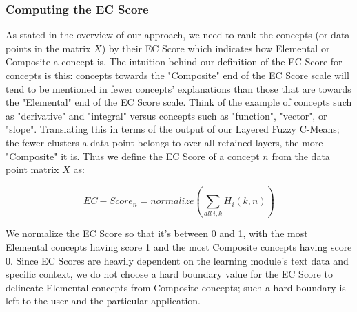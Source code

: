 \subsubsection{Computing the EC Score}\label{calc_ec}
As stated in the overview of our approach, we need to rank the concepts (or data points in the matrix $X$) by their EC Score which indicates how Elemental or Composite a concept is. The intuition behind our definition of the EC Score for concepts is this: concepts towards the "Composite" end of the EC Score scale will tend to be mentioned in fewer concepts' explanations than those that are towards the "Elemental" end of the EC Score scale. Think of the example of concepts such as "derivative" and "integral" versus concepts such as "function", "vector", or "slope". Translating this in terms of the output of our Layered Fuzzy C-Means; the fewer clusters a data point belongs to over all retained layers, the more "Composite" it is. Thus we define the EC Score of a concept $n$ from the data point matrix $X$ as:

\begin{equation}
EC-Score_{n} = normalize(\sum_{all\ i,k} H_{i}(k,n))
\end{equation}

We normalize the EC Score so that it's between 0 and 1, with the most Elemental concepts having score 1 and the most Composite concepts having score 0. Since EC Scores are heavily dependent on the learning module's text data and specific context, we do not choose a hard boundary value for the EC Score to delineate Elemental concepts from Composite concepts; such a hard boundary is left to the user and the particular application.
